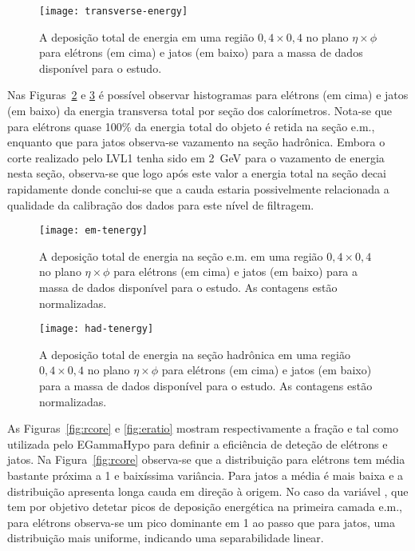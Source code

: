 \begin{figure}
\begin{center}
\texttt{[image: transverse-energy]}
\end{center}
\caption{A deposição total de energia em uma região $0,4 \times 0,4$ no plano
$\eta\times\phi$ para elétrons (em cima) e jatos (em baixo) para a massa de
dados disponível para o estudo.}
\label{fig:transverse-energy}
\end{figure}

Nas Figuras~\ref{fig:em-tenergy} e \ref{fig:had-tenergy} é pos\-sí\-vel
observar histogramas para e\-lé\-trons (em cima) e jatos (em baixo) da energia
transversa total por seção dos calorímetros. Nota-se que para elétrons quase
100\% da energia total do objeto é retida na seção e.m., enquanto que para
jatos observa-se vazamento na seção hadrônica. Embora o corte realizado pelo
LVL1 tenha sido em 2~GeV para o vazamento de energia nesta seção, observa-se
que logo após este valor a energia total na seção decai rapidamente donde
conclui-se que a cauda estaria possivelmente relacionada a qualidade da
calibração dos dados para este nível de filtragem.

\begin{figure}
\begin{center}
\texttt{[image: em-tenergy]}
\end{center}
\caption{A deposição total de energia na seção e.m. em uma região $0,4 \times
0,4$ no plano $\eta\times\phi$ para elétrons (em cima) e jatos (em baixo) para
a massa de dados disponível para o estudo. As contagens estão normalizadas.}
\label{fig:em-tenergy}
\end{figure}

\begin{figure}
\begin{center}
\texttt{[image: had-tenergy]}
\end{center}
\caption{A deposição total de energia na seção hadrônica em uma região $0,4 \times
0,4$ no plano $\eta\times\phi$ para elétrons (em cima) e jatos (em baixo) para
a massa de dados disponível para o estudo. As contagens estão normalizadas.}
\label{fig:had-tenergy}
\end{figure}

As Figuras~\ref{fig:rcore} e \ref{fig:eratio} mostram respectivamente a fração
\rcore e \eratio tal como utilizada pelo EGammaHypo para definir a eficiência
de deteção de elétrons e jatos. Na Figura~\ref{fig:rcore} observa-se que a
distribuição para elétrons tem média bastante próxima a 1 e baixíssima
variância. Para jatos a média é mais baixa e a distribuição apresenta longa
cauda em direção à origem. No caso da variável \eratio, que tem por objetivo
detetar picos de deposição energética na primeira camada e.m., para elétrons
observa-se um pico dominante em 1 ao passo que para jatos, uma distribuição
mais uniforme, indicando uma separabilidade linear.

